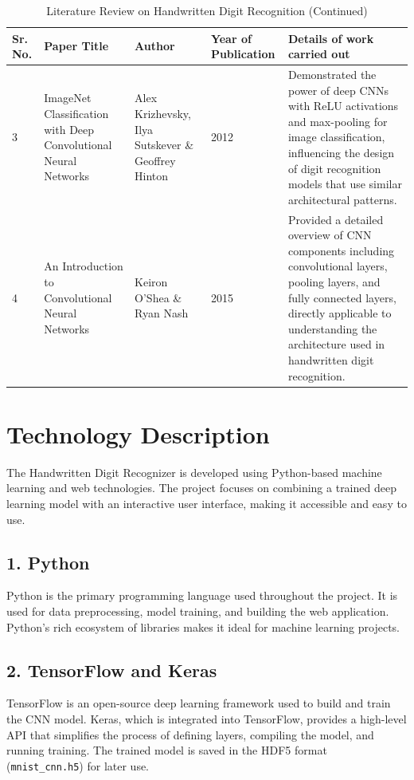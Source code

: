 \documentclass[12pt,a4paper]{report}
\begin{document}
\begin{table}[h!]
\centering
\caption{Literature Review on Handwritten Digit Recognition (Continued)}
\begin{tabular}{|p{1cm}|p{3cm}|p{4cm}|p{3cm}|p{4cm}|}
\hline
\textbf{Sr. No.} & \textbf{Paper Title} & \textbf{Author} & \textbf{Year of Publication} & \textbf{Details of work carried out} \\
\hline

3 & ImageNet Classification with Deep Convolutional Neural Networks &
Alex Krizhevsky, Ilya Sutskever \& Geoffrey Hinton & 2012 & Demonstrated the power of deep CNNs with ReLU activations and max-pooling for image classification, influencing the design of digit recognition models that use similar architectural patterns. \\
\hline

4 & An Introduction to Convolutional Neural Networks &
Keiron O'Shea \& Ryan Nash & 2015 & Provided a detailed overview of CNN components including convolutional layers, pooling layers, and fully connected layers, directly applicable to understanding the architecture used in handwritten digit recognition. \\
\hline

\end{tabular}
\end{table}

\newpage
\section{Technology Description}
The Handwritten Digit Recognizer is developed using Python-based machine learning and web technologies. The project focuses on combining a trained deep learning model with an interactive user interface, making it accessible and easy to use.

\subsection*{1. Python}
Python is the primary programming language used throughout the project. It is used for data preprocessing, model training, and building the web application. Python's rich ecosystem of libraries makes it ideal for machine learning projects.

\subsection*{2. TensorFlow and Keras}
TensorFlow is an open-source deep learning framework used to build and train the CNN model. Keras, which is integrated into TensorFlow, provides a high-level API that simplifies the process of defining layers, compiling the model, and running training. The trained model is saved in the HDF5 format (\texttt{mnist\_cnn.h5}) for later use.
\end{document}
